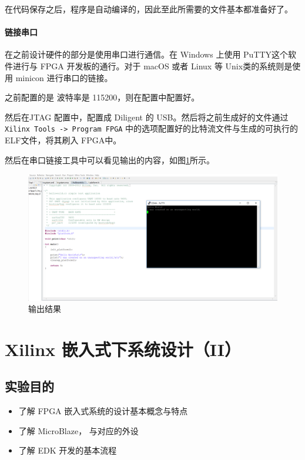 \documentclass{ctexart}
\begin{document}
        在代码保存之后，程序是自动编译的，因此至此所需要的文件基本都准备好了。
        
        \paragraph{链接串口}
        
        在之前设计硬件的部分是使用串口进行通信。在 Windows 上使用
        PuTTY这个软件进行与 FPGA 开发板的通行。对于 macOS 或者 Linux
        等 Unix类的系统则是使用 minicon 进行串口的链接。
        
        之前配置的是 波特率是 115200，则在配置中配置好。
        
        然后在JTAG 配置中，配置成 Diligent 的 USB。然后将之前生成好的文件通过
        \verb|Xilinx Tools -> Program FPGA|  中的选项配置好的比特流文件与生成的可执行的ELF文件，将其刷入 FPGA中。

        然后在串口链接工具中可以看见输出的内容，如图\ref{fig:report3-4}所示。

\begin{figure}
\centering
\includegraphics[width=1\linewidth]{report3-4}
\caption{输出结果}
\label{fig:report3-4}
\end{figure}



        \section{Xilinx 嵌入式下系统设计（II）}
        
        \subsection{实验目的}
        \begin{itemize}
            \item 了解 FPGA 嵌入式系统的设计基本概念与特点
            \item 了解 MicroBlaze， 与对应的外设
            \item 了解 EDK 开发的基本流程
        \end{itemize}
        
\end{document}

